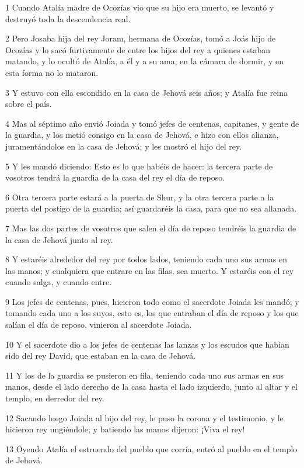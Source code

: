 \par 1 Cuando Atalía madre de Ocozías vio que su hijo era muerto, se levantó y destruyó toda la descendencia real.
\par 2 Pero Josaba hija del rey Joram, hermana de Ocozías, tomó a Joás hijo de Ocozías y lo sacó furtivamente de entre los hijos del rey a quienes estaban matando, y lo ocultó de Atalía, a él y a su ama, en la cámara de dormir, y en esta forma no lo mataron. 
\par 3 Y estuvo con ella escondido en la casa de Jehová seis años; y Atalía fue reina sobre el país.
\par 4 Mas al séptimo año envió Joiada y tomó jefes de centenas, capitanes, y gente de la guardia, y los metió consigo en la casa de Jehová, e hizo con ellos alianza, juramentándolos en la casa de Jehová; y les mostró el hijo del rey.
\par 5 Y les mandó diciendo: Esto es lo que habéis de hacer: la tercera parte de vosotros tendrá la guardia de la casa del rey el día de reposo.
\par 6 Otra tercera parte estará a la puerta de Shur, y la otra tercera parte a la puerta del postigo de la guardia; así guardaréis la casa, para que no sea allanada.
\par 7 Mas las dos partes de vosotros que salen el día de reposo tendréis la guardia de la casa de Jehová junto al rey. 
\par 8 Y estaréis alrededor del rey por todos lados, teniendo cada uno sus armas en las manos; y cualquiera que entrare en las filas, sea muerto. Y estaréis con el rey cuando salga, y cuando entre.
\par 9 Los jefes de centenas, pues, hicieron todo como el sacerdote Joiada les mandó; y tomando cada uno a los suyos, esto es, los que entraban el día de reposo y los que salían el día de reposo, vinieron al sacerdote Joiada.
\par 10 Y el sacerdote dio a los jefes de centenas las lanzas y los escudos que habían sido del rey David, que estaban en la casa de Jehová.
\par 11 Y los de la guardia se pusieron en fila, teniendo cada uno sus armas en sus manos, desde el lado derecho de la casa hasta el lado izquierdo, junto al altar y el templo, en derredor del rey.
\par 12 Sacando luego Joiada al hijo del rey, le puso la corona y el testimonio, y le hicieron rey ungiéndole; y batiendo las manos dijeron: ¡Viva el rey!
\par 13 Oyendo Atalía el estruendo del pueblo que corría, entró al pueblo en el templo de Jehová.
